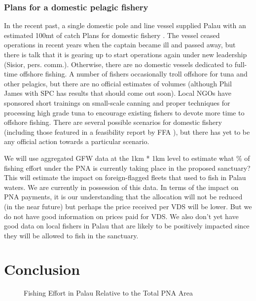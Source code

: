 \documentclass[11pt,english]{article}
\begin{document}
%

\subsubsection{Plans for a domestic pelagic fishery}

In the recent past, a single domestic pole and line vessel supplied Palau with an estimated 100mt of catch Plans for domestic fishery \citep{Gillett2016}. The vessel ceased operations in recent years when the captain became ill and passed away, but there is talk that it is gearing up to start operations again under new leadership (Sisior, pers. comm.). Otherwise, there are no domestic vessels dedicated to full-time offshore fishing. A number of fishers occasionally troll offshore for tuna and other pelagics, but there are no official estimates of volumes (although Phil James with SPC has results that should come out soon). 
Local NGOs have sponsored short trainings on small-scale canning and proper techniques for processing high grade tuna to encourage existing fishers to devote more time to offshore fishing. There are several possible scenarios for domestic fishery (including those featured in a feasibility report by FFA \citep{Skirtun2017}), but there has yet to be any official action towards a particular scenario. 
 

We will use aggregated GFW data at the 1km * 1km level to estimate what \% of fishing effort under the PNA is currently taking place in the proposed sanctuary? This will estimate the impact on foreign-flagged fleets that used to fish in Palau waters. We are currently in possession of this data. In terms of the impact on PNA payments, it is our understanding that the allocation will not be reduced (in the near future) but perhaps the price received per VDS will be lower. But we do not have good information on prices paid for VDS. We also don’t yet have good data on local fishers in Palau that are likely to be positively impacted since they will be allowed to fish in the sanctuary. 

\section{Conclusion}\label{conclude}

\begin{figure}[h]
	\caption{Fishing Effort in Palau Relative to the Total PNA Area}
\end{figure}
\end{document}

